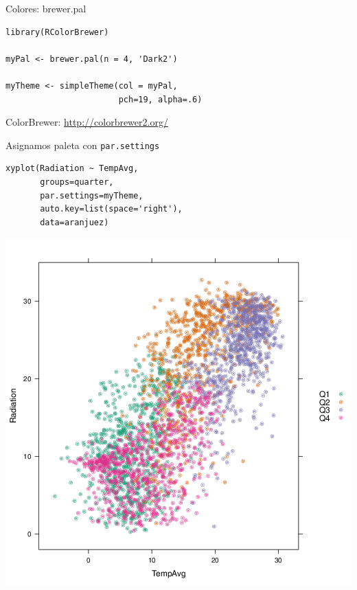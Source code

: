 \documentclass[xcolor={usenames,svgnames,dvipsnames}]{beamer}
\begin{document}
\begin{frame}[fragile,label={sec:orgheadline32}]{Colores: brewer.pal}
 \lstset{language=R,label= ,caption= ,captionpos=b,numbers=none}
\begin{lstlisting}
library(RColorBrewer)

myPal <- brewer.pal(n = 4, 'Dark2')

myTheme <- simpleTheme(col = myPal,
                       pch=19, alpha=.6)
\end{lstlisting}

\begin{block}{ColorBrewer: \url{http://colorbrewer2.org/}}
\end{block}
\end{frame}

\begin{frame}[fragile,label={sec:orgheadline33}]{Asignamos paleta con \texttt{par.settings}}
 \lstset{language=R,label= ,caption= ,captionpos=b,numbers=none}
\begin{lstlisting}
xyplot(Radiation ~ TempAvg,
       groups=quarter,
       par.settings=myTheme,
       auto.key=list(space='right'),
       data=aranjuez)
\end{lstlisting}
\end{frame}

\begin{frame}[label={sec:orgheadline34}]{}
\includegraphics[width=.9\linewidth]{figs/brewer.png}
\end{frame}
\end{document}
